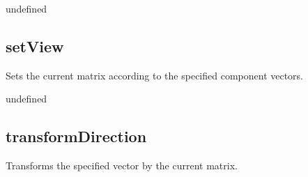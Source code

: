 \documentclass[letterpaper,12pt,english,openany,oneside]{sphinxmanual}
\begin{document}
\label{\detokenize{JS_3D_API:syntax-58}}

\begin{sphinxVerbatim}[commandchars=\\\{\}]
\end{sphinxVerbatim}
\label{\detokenize{JS_3D_API:returns-59}}

undefined


\subsection{setView}
\label{\detokenize{JS_3D_API:setview}}
Sets the current matrix according to the specified component vectors.

\label{\detokenize{JS_3D_API:syntax-59}}

\begin{sphinxVerbatim}[commandchars=\\\{\}]
  
\end{sphinxVerbatim}
\label{\detokenize{JS_3D_API:parameters-45}}

\label{\detokenize{JS_3D_API:section-64}}\label{\detokenize{JS_3D_API:returns-60}}

undefined


\subsection{transformDirection}
\label{\detokenize{JS_3D_API:transformdirection}}
Transforms the specified vector by the current matrix.

\label{\detokenize{JS_3D_API:syntax-60}}

\begin{sphinxVerbatim}[commandchars=\\\{\}]
\end{sphinxVerbatim}
\label{\detokenize{JS_3D_API:parameters-46}}

\label{\detokenize{JS_3D_API:section-65}}\label{\detokenize{JS_3D_API:returns-61}}
\end{document}
